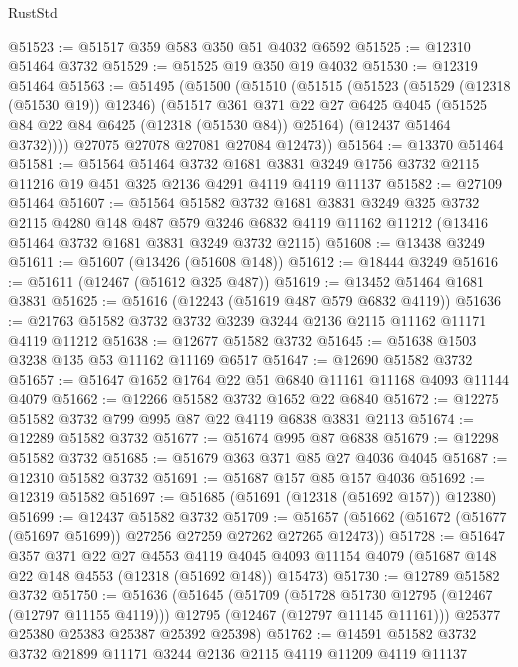 \begin{lexlean}{RustStd}
\begin{coremodule}
@51523 := @51517 @359 @583 @350 @51 @4032 @6592
@51525 := @12310 @51464 @3732
@51529 := @51525 @19 @350 @19 @4032
@51530 := @12319 @51464
@51563 := @51495
    (@51500
      (@51510
        (@51515
          (@51523
            (@51529 (@12318 (@51530 @19)) @12346)
            (@51517
              @361
              @371
              @22
              @27
              @6425
              @4045
              (@51525 @84 @22 @84 @6425 (@12318 (@51530 @84)) @25164)
              (@12437 @51464 @3732))))
        @27075
        @27078
        @27081
        @27084
        @12473))
@51564 := @13370 @51464
@51581 := @51564
    @51464
    @3732
    @1681
    @3831
    @3249
    @1756
    @3732
    @2115
    @11216
    @19
    @451
    @325
    @2136
    @4291
    @4119
    @4119
    @11137
@51582 := @27109 @51464
@51607 := @51564
    @51582
    @3732
    @1681
    @3831
    @3249
    @325
    @3732
    @2115
    @4280
    @148
    @487
    @579
    @3246
    @6832
    @4119
    @11162
    @11212
    (@13416 @51464 @3732 @1681 @3831 @3249 @3732 @2115)
@51608 := @13438 @3249
@51611 := @51607 (@13426 (@51608 @148))
@51612 := @18444 @3249
@51616 := @51611 (@12467 (@51612 @325 @487))
@51619 := @13452 @51464 @1681 @3831
@51625 := @51616 (@12243 (@51619 @487 @579 @6832 @4119))
@51636 := @21763 @51582 @3732 @3732 @3239 @3244 @2136 @2115 @11162 @11171 @4119 @11212
@51638 := @12677 @51582 @3732
@51645 := @51638 @1503 @3238 @135 @53 @11162 @11169 @6517
@51647 := @12690 @51582 @3732
@51657 := @51647 @1652 @1764 @22 @51 @6840 @11161 @11168 @4093 @11144 @4079
@51662 := @12266 @51582 @3732 @1652 @22 @6840
@51672 := @12275 @51582 @3732 @799 @995 @87 @22 @4119 @6838 @3831 @2113
@51674 := @12289 @51582 @3732
@51677 := @51674 @995 @87 @6838
@51679 := @12298 @51582 @3732
@51685 := @51679 @363 @371 @85 @27 @4036 @4045
@51687 := @12310 @51582 @3732
@51691 := @51687 @157 @85 @157 @4036
@51692 := @12319 @51582
@51697 := @51685 (@51691 (@12318 (@51692 @157)) @12380)
@51699 := @12437 @51582 @3732
@51709 := @51657 (@51662 (@51672 (@51677 (@51697 @51699)) @27256 @27259 @27262 @27265 @12473))
@51728 := @51647
    @357
    @371
    @22
    @27
    @4553
    @4119
    @4045
    @4093
    @11154
    @4079
    (@51687 @148 @22 @148 @4553 (@12318 (@51692 @148)) @15473)
@51730 := @12789 @51582 @3732
@51750 := @51636
    (@51645
      (@51709
        (@51728 @51730 @12795 (@12467 (@12797 @11155 @4119)))
        @12795
        (@12467 (@12797 @11145 @11161)))
      @25377
      @25380
      @25383
      @25387
      @25392
      @25398)
@51762 := @14591 @51582 @3732 @3732 @21899 @11171 @3244 @2136 @2115 @4119 @11209 @4119 @11137

\end{coremodule}
\end{lexlean}
